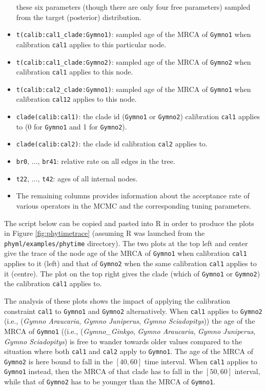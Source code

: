 \documentclass[a4paper,12pt]{article}
\newcommand{\x}[1]{\texttt{#1}}
\begin{document}
\begin{itemize}
  these six parameters (though there are only four free parameters) sampled from the target
  (posterior) distribution.  
\item \x{t(calib:cal1\_clade:Gymno1)}: sampled age of the MRCA of \x{Gymno1} when calibration
  \x{cal1} applies to this particular node.
\item \x{t(calib:cal1\_clade:Gymno2)}: sampled age of the MRCA of \x{Gymno2} when calibration
  \x{cal1} applies to this node.
\item \x{t(calib:cal2\_clade:Gymno1)}: sampled age of the MRCA of \x{Gymno1} when calibration
  \x{cal12} applies to this node.
\item \x{clade(calib:cal1)}: the clade id (\x{Gymno1} or \x{Gymno2}) calibration \x{cal1} applies
  to (0 for \x{Gymno1} and 1 for \x{Gymno2}).
\item \x{clade(calib:cal2)}: the clade id calibration \x{cal2} applies
  to.
\item \x{br0}, $\ldots$, \x{br41}: relative rate on all edges in the tree.
\item \x{t22}, $\ldots$, \x{t42}: ages of all internal nodes.
\item The remaining columns provides information about the acceptance rate of various operators in
  the MCMC and the corresponding tuning parameters.
\end{itemize}

The script below can be copied and pasted into R in order to produce the plots in Figure
\ref{fig:phytimetrace} (assuming R was launched from the \x{phyml/examples/phytime} directory). The two plots at the top left and center give the trace of the node age of
the MRCA of \x{Gymno1} when calibration \x{cal1} applies to it (left) and that of \x{Gymno2} when
the same calibration \x{cal1} applies to it (centre). The plot on the top right gives the clade (which of
\x{Gymno1} or \x{Gymno2}) the calibration \x{cal1} applies to.

The analysis of these  plots
shows the impact of applying the calibration constraint \x{cal1} to \x{Gymno1} and \x{Gymno2} alternatively.
When \x{cal1} applies to \x{Gymno2} (i.e., ({\em Gymno Araucaria},  {\em Gymno Juniperus}, {\em Gymno
  Sciadopitys})) the age of the MRCA of \x{Gymno1} ((i.e., ({\em Gymno\_Ginkgo}, {\em Gymno Araucaria},  {\em Gymno Juniperus}, {\em Gymno
  Sciadopitys}) is  free to wander towards older values compared to the situation where both
\x{cal1} and \x{cal2} apply to \x{Gymno1}. The age of the MRCA of \x{Gymno2} is here bound to fall in the
$[40,60]$ time interval. When \x{cal1} applies to \x{Gymno1} instead, then the MRCA of that clade
has to fall in the $[50,60]$ interval, while that of \x{Gymno2} has to be younger than the MRCA of \x{Gymno1}.
\end{document}
